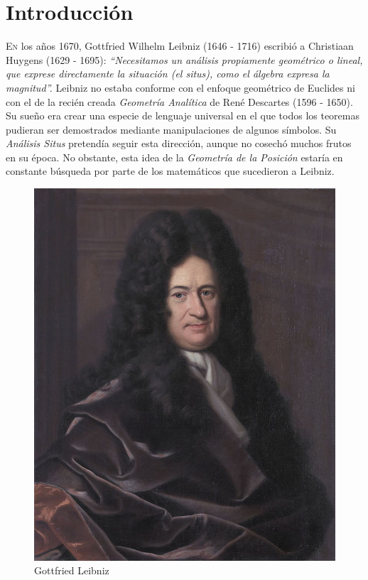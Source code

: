 \chapter*{Introducción}

    \lettrine[lines=7] {\initfamily  \selectfont E}{n} los años 1670, Gottfried Wilhelm Leibniz (1646 - 1716) escribió a Christiaan Huygens (1629 - 1695): \textit{``Necesitamos un análisis propiamente geométrico o lineal, que exprese directamente la situación (el situs), como el álgebra expresa la magnitud''.} Leibniz no estaba conforme con el enfoque geométrico de Euclides ni con el de la recién creada \textit{Geometría Analítica} de René Descartes (1596 - 1650). Su sueño era crear una especie de lenguaje universal en el que todos los teoremas pudieran ser demostrados mediante manipulaciones de algunos símbolos. Su \textit{Análisis Situs} pretendía seguir esta dirección, aunque no cosechó muchos frutos en su época. No obstante, esta idea de la \textit{Geometría de la Posición} estaría en constante búsqueda por parte de los matemáticos que sucedieron a Leibniz.
    
            \begin{figure}
            \centering
            \includegraphics[scale=0.5]{img/imgintro/Gottfried_Wilhelm_Leibniz,_Bernhard_Christoph_Francke.jpg}
            \caption{Gottfried Leibniz}
            \label{fig:euler} 
            \vspace{-0.8cm}
        \end{figure}


